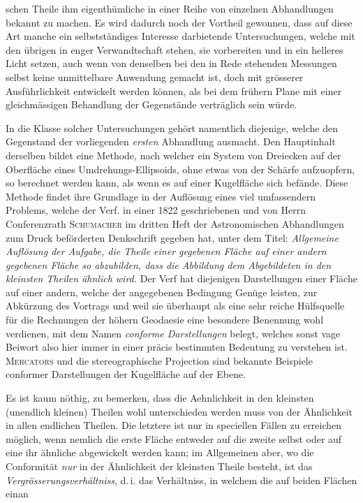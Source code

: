 %
schen Theile ihm eigenthümliche in einer Reihe von einzelnen Abhandlungen bekannt zu machen. Es wird dadurch noch der Vortheil gewonnen, dass auf diese Art manche ein selbstständiges Interesse darbietende Untersuchungen, welche mit den übrigen in enger Verwandtschaft stehen, sie vorbereiten und in ein helleres Licht setzen, auch wenn von denselben bei den in Rede stehenden Messungen selbst keine unmittelbare Anwendung gemacht ist, doch mit grösserer Ausführlichkeit entwickelt werden können, als bei dem frühern Plane mit einer gleichmässigen Behandlung der Gegenstände verträglich sein würde.

In die Klasse solcher Untersuchungen gehört namentlich diejenige, welche den Gegenstand der vorliegenden \textit{ersten} Abhandlung ausmacht. Den Hauptinhalt derselben bildet eine Methode, nach welcher ein System von Dreiecken auf der Oberfläche eines Umdrehungs-Ellipsoids, ohne etwas von der Schärfe aufzuopfern, so berechnet werden kann, als wenn es auf einer Kugelfläche sich befände. Diese Methode findet ihre Grundlage in der Auflösung eines viel umfassendern Problems, welche der Verf. in einer 1822 geschriebenen und von Herrn Conferenzrath \textsc{Schumacher} im dritten Heft der Astronomischen Abhandlungen zum Druck beförderten Denkschrift gegeben hat, unter dem Titel: \textit{Allgemeine Auflösung der Aufgabe, die Theile einer gegebenen Fläche auf einer andern gegebenen Fläche so abzubilden, dass die Abbildung dem Abgebildeten in den kleinsten Theilen ähnlich wird.} Der Verf hat diejenigen Darstellungen einer Fläche auf einer andern, welche der angegebenen Bedingung Genüge leisten, zur Abkürzung des Vortrags und weil sie überhaupt als eine sehr reiche Hülfsquelle für die Rechnungen der höhern Geodaesie eine besondere Benennung wohl verdienen, mit dem Namen \textit{conforme Darstellungen} belegt, welches sonst vage Beiwort also hier immer in einer präcis bestimmten Bedeutung zu verstehen ist. \textsc{Mercators} und die stereographische Projection sind bekannte Beispiele conformer Darstellungen der Kugelfläche auf der Ebene.

Es ist kaum nöthig, zu bemerken, dass die Aehnlichkeit in den kleinsten (unendlich kleinen) Theilen wohl unterschieden werden muss von der Ähnlichkeit in allen endlichen Theilen. Die letztere ist nur in speciellen Fällen zu erreichen möglich, wenn nemlich die erste Fläche entweder auf die zweite selbst oder auf eine ihr ähnliche abgewickelt werden kann; im Allgemeinen aber, wo die Conformität \textit{nur} in der Ähnlichkeit der kleinsten Theile besteht, ist das \textit{Vergrösserungsverhältniss}, d.\,i. das Verhältniss, in welchem die auf beiden Flächen einan%
